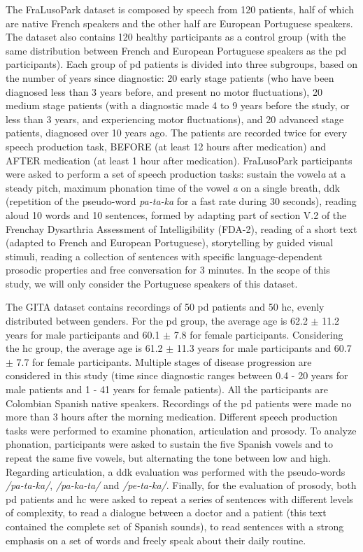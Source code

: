 The FraLusoPark dataset is composed by speech from 120 patients, half of which are native French speakers and the other half are European Portuguese speakers. The dataset also contains 120 healthy participants as a control group (with the same distribution between French and European Portuguese speakers as the \gls{pd} participants). Each group of \gls{pd} patients is divided into three subgroups, based on the number of years since diagnostic: 20 early stage patients (who have been diagnosed less than 3 years before, and present no motor fluctuations), 20 medium stage patients (with a diagnostic made 4 to 9 years before the study, or less than 3 years, and experiencing motor fluctuations), and 20 advanced stage patients, diagnosed over 10 years ago. The patients are recorded twice for every speech production task, BEFORE (at least 12 hours after medication) and AFTER medication (at least 1 hour after medication). FraLusoPark participants were asked to perform a set of speech production tasks: sustain the vowel\textit{\/a\/} at a steady pitch, maximum phonation time of the vowel \textit{\/a\/} on a single breath, \gls{ddk} (repetition of the pseudo-word \textit{\/pa-ta-ka\/} for a fast rate during 30 seconds), reading aloud 10 words and 10 sentences, formed by adapting part of section V.2 of the Frenchay Dysarthria Assessment of Intelligibility (FDA-2), reading of a short text (adapted to French and European Portuguese), storytelling by guided visual stimuli, reading a collection of sentences with specific language-dependent prosodic properties and free conversation for 3 minutes. In the scope of this study, we will only consider the Portuguese speakers of this dataset.

The GITA dataset contains recordings of 50 \gls{pd} patients and 50 \gls{hc}, evenly distributed between genders. For the \gls{pd} group, the average age is 62.2 $\pm$ 11.2 years for male participants and 60.1 $\pm$ 7.8 for female participants. Considering the \gls{hc} group, the average age is 61.2 $\pm$ 11.3 years for male participants and 60.7 $\pm$ 7.7 for female participants. Multiple stages of disease progression are considered in this study (time since diagnostic ranges between 0.4 - 20 years for male patients and 1 - 41 years for female patients). All the participants are Colombian Spanish native speakers. Recordings of the \gls{pd} patients were made no more than 3 hours after the morning medication. Different speech production tasks were performed to examine phonation, articulation and prosody. To analyze phonation, participants were asked to sustain the five Spanish vowels and to repeat the same five vowels, but alternating the tone between low and high. Regarding articulation, a \gls{ddk} evaluation was performed with the pseudo-words \textit{/pa-ta-ka/}, \textit{/pa-ka-ta/} and \textit{/pe-ta-ka/}. Finally, for the evaluation of prosody, both \gls{pd} patients and \gls{hc} were asked to repeat a series of sentences with different levels of complexity, to read a dialogue between a doctor and a patient (this text contained the complete set of Spanish sounds), to read sentences with a strong emphasis on a set of words and freely speak about their daily routine. 

